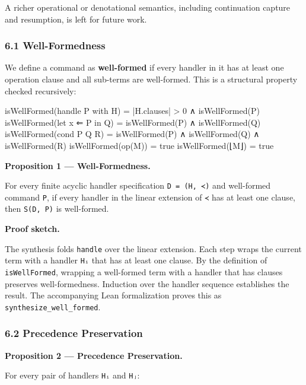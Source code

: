 \documentclass[
  11pt,
]{article}
\newenvironment{Shaded}{}{}
\newcommand{\NormalTok}[1]{#1}
\begin{document}
A richer operational or denotational semantics, including continuation
capture and resumption, is left for future work.

\subsubsection{6.1 Well-Formedness}\label{well-formedness}

We define a command as \textbf{well-formed} if every handler in it has
at least one operation clause and all sub-terms are well-formed. This is
a structural property checked recursively:

\begin{Shaded}
\begin{Highlighting}[]
\NormalTok{isWellFormed(handle P with H) = |H.clauses| \textgreater{} 0 ∧ isWellFormed(P)}
\NormalTok{isWellFormed(let x ⇐ P in Q)   = isWellFormed(P) ∧ isWellFormed(Q)}
\NormalTok{isWellFormed(cond P Q R)       = isWellFormed(P) ∧ isWellFormed(Q) ∧ isWellFormed(R)}
\NormalTok{isWellFormed(op(M))            = true}
\NormalTok{isWellFormed(⌊M⌋)              = true}
\end{Highlighting}
\end{Shaded}

\textbf{Proposition 1 --- Well-Formedness.}

For every finite acyclic handler specification \texttt{D\ =\ (H,\ ≺)}
and well-formed command \texttt{P}, if every handler in the linear
extension of \texttt{≺} has at least one clause, then \texttt{S(D,\ P)}
is well-formed.

\textbf{Proof sketch.}

The synthesis folds \texttt{handle} over the linear extension. Each step
wraps the current term with a handler \texttt{Hᵢ} that has at least one
clause. By the definition of \texttt{isWellFormed}, wrapping a
well-formed term with a handler that has clauses preserves
well-formedness. Induction over the handler sequence establishes the
result. The accompanying Lean formalization proves this as
\texttt{synthesize\_well\_formed}.

\subsubsection{6.2 Precedence
Preservation}\label{precedence-preservation}

\textbf{Proposition 2 --- Precedence Preservation.}

For every pair of handlers \texttt{Hᵢ} and \texttt{Hⱼ}:
\end{document}
